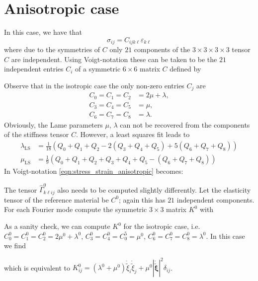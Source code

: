 \documentclass[11pt]{article}
\renewcommand{\vec}[1]{\boldsymbol{#1}}
\begin{document}
\section{Anisotropic case}
In this case, we have that
\begin{equation}
\sigma_{ij} = C_{ijk\ell}\varepsilon_{k\ell}\label{eqn:stress_strain_anisotropic}
\end{equation}
where due to the symmetries of $C$ only $21$ components of the $3\times 3\times 3 \times 3$ tensor $C$ are independent. Using Voigt-notation these can be taken to be the $21$ independent entries $C_{i}$ of a symmetric $6\times 6$ matrix $C$ defined by

Observe that in the isotropic case the only non-zero entries $C_j$ are
\begin{equation}
\begin{aligned}
C_0 = C_1 = C_2 &= 2\mu + \lambda,\\
C_3 = C_4 = C_5 &= \mu,\\
C_6 = C_7 = C_8 &= \lambda.
\end{aligned}
\end{equation}
Obviously, the Lame parameters $\mu$, $\lambda$ can not be recovered from the components of the stiffness tensor $C$. However, a least squares fit leads to
\begin{equation}
\begin{aligned}
\lambda_{\text{LS}} &= \frac{1}{18}\left(Q_0+Q_1+Q_2 - 2 (Q_3+Q_4+Q_5) + 5(Q_6+Q_7+Q_8)
\right)\\
\mu_{\text{LS}} &= \frac{1}{9}\left(Q_0+Q_1+Q_2+Q_3+Q_4+Q_5-(Q_6+Q_7+Q_8)\right)
\end{aligned}
\end{equation}
In Voigt-notation \eqref{eqn:stress_strain_anisotropic} becomes:

The tensor $\widehat{\Gamma}^{0}_{k\ell ij}$ also needs to be computed slightly differently. Let the elasticity tensor of the reference material be $C^0$; again this has $21$ independent components.
For each Fourier mode compute the symmetric $3\times 3$ matrix $K^{0}$ with

As a sanity check, we can compute $K^0$ for the isotropic case, i.e. $C^0_0=C^0_1=C^0_2=2\mu^0+\lambda^0$, $C^0_3=C^0_4=C^5_0=\mu^0$, $C^0_6=C^0_7=C^0_8=\lambda^0$. In this case we find

which is equivalent to $K^0_{ij} = (\lambda^0+\mu^0)\mathring{\widetilde{\xi}}_i\mathring{\widetilde{\xi}}_j + \mu^0 |\mathring{\widetilde{\vec{\xi}}}|^2 \delta_{ij}$.
\end{document}
